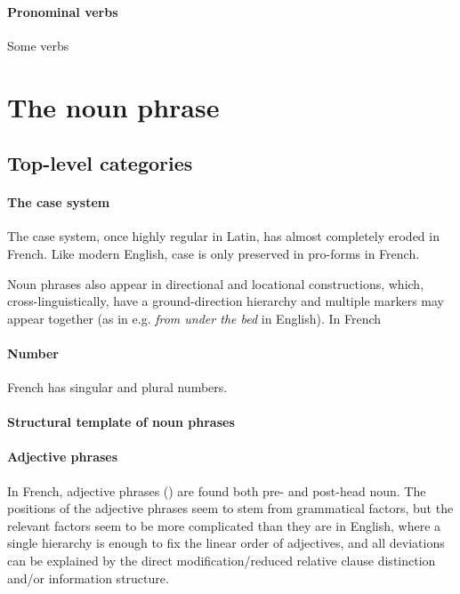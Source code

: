 \documentclass[a4paper, oneside, 12pt]{report}
\newcommand{\form}[1]{\emph{#1}}
\begin{document}
\paragraph*{Pronominal verbs}
Some verbs 

\section{The noun phrase}

\subsection{Top-level categories}

\paragraph*{The case system}\label{sec:grammatical.np.peripheral.case}
The case system, once highly regular in Latin, has almost completely eroded in French.
Like modern English, case is only preserved in pro-forms in French.

Noun phrases also appear in directional and locational constructions,
which, cross-linguistically, have a ground-direction hierarchy and multiple markers may appear together
(as in e.g. \form{from under the bed} in English).
In French 

\paragraph*{Number} French has singular and plural numbers.

\paragraph*{Structural template of noun phrases}

\paragraph*{Adjective phrases}
In French, adjective phrases () are found both pre- and post-head noun.
The positions of the adjective phrases seem to stem from grammatical factors,
but the relevant factors seem to be more complicated than they are in English,
where a single hierarchy is enough to fix the linear order of adjectives,
and all deviations can be explained by the direct modification/reduced relative clause distinction
and/or information structure.
\end{document}
